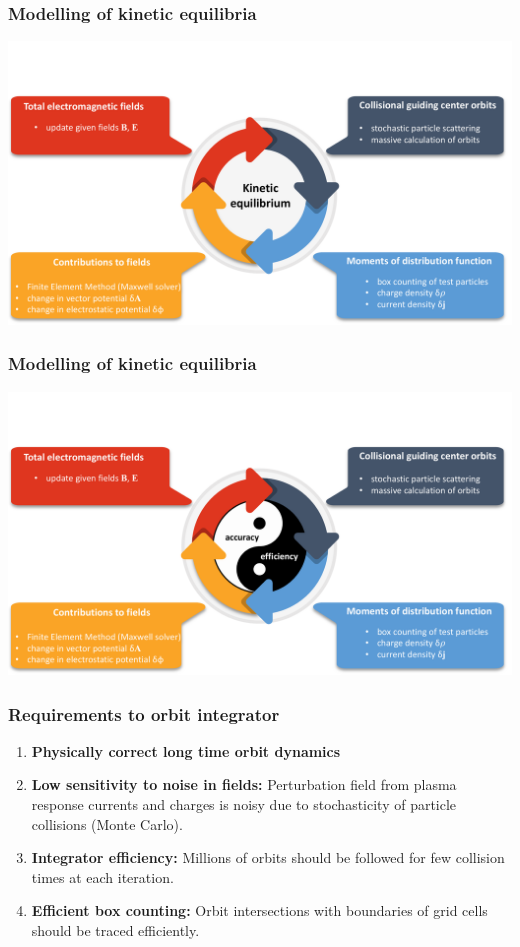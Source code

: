 \documentclass{beamer}
\begin{document}
\begin{frame}
\frametitle{Modelling of kinetic equilibria}
	\centering \includegraphics[trim={0 0 0 3cm},clip,width=\textwidth]{FIGURES/cycle01.pdf}
\end{frame}


\begin{frame}[noframenumbering]
\frametitle{Modelling of kinetic equilibria}
	\centering \includegraphics[trim={0 0 0 3cm},clip,width=\textwidth]{FIGURES/cycle02.pdf}
\end{frame}






\begin{frame}
\frametitle{Requirements to orbit integrator}
\begin{enumerate}
\item \textbf{Physically correct long time orbit dynamics}
\item \textbf{Low sensitivity to noise in fields:} Perturbation field from plasma response currents and charges is noisy due to stochasticity of particle collisions (Monte Carlo).
\item \textbf{Integrator efficiency:} Millions of orbits should be followed for few collision times at each iteration.
\item \textbf{Efficient box counting:} Orbit intersections with boundaries of grid cells should be traced efficiently.

\end{enumerate}
\end{frame}
\end{document}
